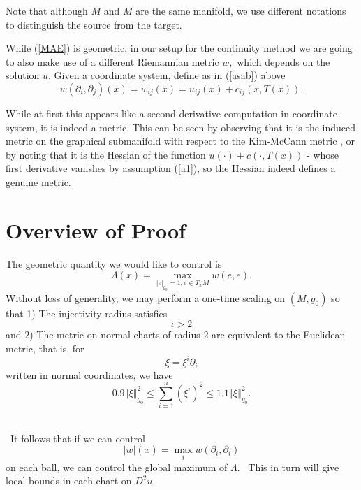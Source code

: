 \documentclass[11pt,letterpaper]{amsart}%
\numberwithin{equation}{section}
\begin{document}
Note that although $M$ and $\bar{M}$ are the same manifold, we use different notations to distinguish the source from the target. 


While (\ref{MAE}) is geometric,  in our setup for the continuity method we are going to also make use of a
different Riemannian metric $w,$ which depends on the solution $u$.  Given a coordinate system, define as in  (\ref{asab}) above
\[
w(\partial_{i},\partial_{j})(x)=w_{ij}(x)=u_{ij}(x)+c_{ij}(x,T(x)).  
\]

While at first this appears like a second derivative computation in coordinate system,  it is indeed a metric.  This can be seen by observing that it is the induced metric on the graphical submanifold with respect to the Kim-McCann metric \cite{KM},  or by noting that it is the Hessian of the function $u\left(  \cdot\right) +c(\cdot,T(x))$  - whose first derivative vanishes by assumption (\ref{a1}), so the Hessian indeed defines a genuine metric.

\section{Overview of Proof}

The geometric quantity we would like to control is
\begin{equation}
\Lambda(x)=\max_{\left\vert e\right\vert _{g_{0}}=1,e\in T_{x}M}w(e,e).
\label{lambdadef}%
\end{equation}
Without loss of generality, we may perform a one-time scaling on $\left(
M,g_{0}\right)  $ so that 1) The injectivity radius satisfies
\begin{equation}
\iota>2 \label{mep}%
\end{equation} and 2) The metric on normal charts of radius $2$ are equivalent to the Euclidean
metric, that is, for%
\[
\xi=\xi^{i}\partial_{i}%
\]
written in normal coordinates, we have
\begin{equation}
0.9\left\Vert \xi\right\Vert _{g_{0}}^{2}\leq\sum_{i=1}^{n}\left(  \xi
^{i}\right)  ^{2}\leq1.1\left\Vert \xi\right\Vert _{g_{0}}^{2} \label{meq}.%
\end{equation}
\ 

\ It follows that if we can control
\begin{equation}
|w|(x)=\max_{i}w(\partial_{i},\partial_{i}) \label{wabdef}%
\end{equation}
on each ball, we can control the global maximum of $\Lambda.$ \ This in turn
will give local bounds in each chart on $D^{2}u.$ \ 
\end{document}
